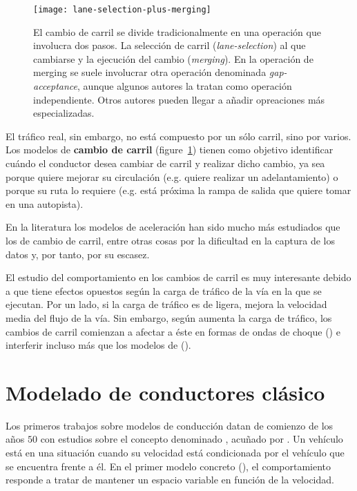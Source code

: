 \begin{figure}[b]
	\centering
	\texttt{[image: lane-selection-plus-merging]}
	\caption[Operaciones involucradas en el proceso de cambio de carril]{El cambio de carril se divide tradicionalmente en una operación que involucra dos pasos. La selección de carril (\textit{lane-selection}) al que cambiarse y la ejecución del cambio (\textit{merging}). En la operación de merging se suele involucrar otra operación denominada \textit{gap-acceptance}, aunque algunos autores la tratan como operación independiente. Otros autores pueden llegar a añadir opreaciones más especializadas.}
	\label{fig:lane-selection-plus-merging}
\end{figure}

El tráfico real, sin embargo, no está compuesto por un sólo carril, sino por varios. Los modelos de \textbf{cambio de carril} (figure~\ref{fig:lane-selection-plus-merging}) tienen como objetivo identificar cuándo el conductor desea cambiar de carril y realizar dicho cambio, ya sea porque quiere mejorar su circulación (e.g. quiere realizar un adelantamiento) o porque su ruta lo requiere (e.g. está próxima la rampa de salida que quiere tomar en una autopista).

En la literatura los modelos de aceleración han sido mucho más estudiados que los de cambio de carril, entre otras cosas por la dificultad en la captura de los datos y, por tanto, por su escasez.

El estudio del comportamiento en los cambios de carril es muy interesante debido a que tiene efectos opuestos según la carga de tráfico de la vía en la que se ejecutan. Por un lado, si la carga de tráfico es de ligera, mejora la velocidad media del flujo de la vía. Sin embargo, según aumenta la carga de tráfico, los cambios de carril comienzan a afectar a éste en formas de ondas de choque (\cite{Sasoh2002, Jin2006}) e interferir incluso más que los modelos de \textit{} (\cite{Laval2006}).

\section{Modelado de conductores clásico}

Los primeros trabajos sobre modelos de conducción datan de comienzo de los años $50$ con estudios sobre el concepto denominado \textbf{}, acuñado por \cite{reuschel1950fahrzeugbewegungen}. Un vehículo está en una situación  cuando su velocidad está condicionada por el vehículo que se encuentra frente a él. En el primer modelo concreto (\cite{Pipes1953}), el comportamiento responde a tratar de mantener un espacio variable en función de la velocidad.

